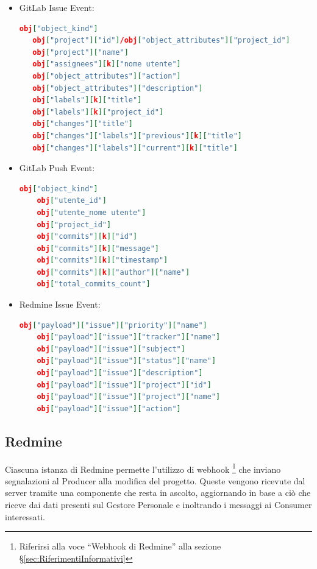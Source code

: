     \begin{itemize}

            \item GitLab Issue Event:
        \begin{lstlisting}[language = json]
   obj["object_kind"]
   obj["project"]["id"]/obj["object_attributes"]["project_id"]
   obj["project"]["name"]
   obj["assignees"][k]["nome utente"]
   obj["object_attributes"]["action"]
   obj["object_attributes"]["description"]
   obj["labels"][k]["title"]
   obj["labels"][k]["project_id"]
   obj["changes"]["title"]
   obj["changes"]["labels"]["previous"][k]["title"]
   obj["changes"]["labels"]["current"][k]["title"]
        \end{lstlisting}

            \item GitLab Push Event:
        \begin{lstlisting}[language = json]
    obj["object_kind"]
    obj["utente_id"]
    obj["utente_nome utente"]
    obj["project_id"]
    obj["commits"][k]["id"]
    obj["commits"][k]["message"]
    obj["commits"][k]["timestamp"]
    obj["commits"][k]["author"]["name"]
    obj["total_commits_count"]
        \end{lstlisting}

            \item Redmine Issue Event:
        \begin{lstlisting}[language = json]
    obj["payload"]["issue"]["priority"]["name"]
    obj["payload"]["issue"]["tracker"]["name"]
    obj["payload"]["issue"]["subject"]
    obj["payload"]["issue"]["status"]["name"]
    obj["payload"]["issue"]["description"]
    obj["payload"]["issue"]["project"]["id"]
    obj["payload"]["issue"]["project"]["name"]
    obj["payload"]["issue"]["action"]
        \end{lstlisting}
    \end{itemize}

		\subsection{Redmine}
		Ciascuna istanza di Redmine permette l'utilizzo di webhook%
        \footnote{Riferirsi alla voce ``Webhook di Redmine'' alla sezione \S\ref{sec:RiferimentiInformativi}}
        che inviano segnalazioni al Producer alla modifica del progetto.
        Queste vengono ricevute dal server tramite una componente che resta in ascolto,
        aggiornando in base a ciò che riceve dai dati presenti sul Gestore Personale e inoltrando i messaggi
        ai Consumer interessati.
		
